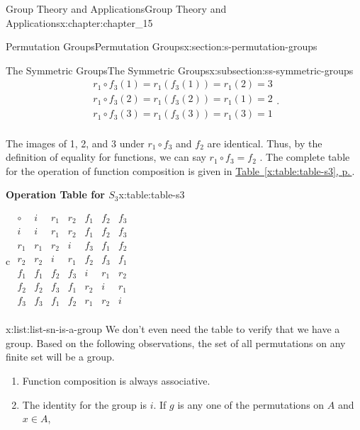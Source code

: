\documentclass[twoside,10pt,]{book}
\newcommand{\tabularfont}{\relax}
\newcommand{\xreffont}{\relax}
\numberwithin{equation}{section}
\newcommand{\hrulethick} {\noalign{\hrule height 0.11em}}
\begin{document}
\begin{chapterptx}{Group Theory and Applications}{}{Group Theory and Applications}{}{}{x:chapter:chapter_15}
\begin{sectionptx}{Permutation Groups}{}{Permutation Groups}{}{}{x:section:s-permutation-groups}
\begin{subsectionptx}{The Symmetric Groups}{}{The Symmetric Groups}{}{}{x:subsection:ss-symmetric-groups}
\begin{equation*}
\begin{array}{c}
r_1\circ f_3(1) =r_1\left(f_3(1)\right)= r_1(2)=3 \\
r_1\circ f_3(2)=r_1\left(f_3(2)\right)= r_1(1)= 2 \\
r_1\circ f_3(3)=r_1\left(f_3(3)\right)= r_1(3)= 1\\
\end{array}\text{.}
\end{equation*}
%
\par
The images of 1, 2, and 3 under \(r_1\circ f_3\) and \(f_2\) are identical. Thus, by the definition of equality for functions, we can say \(r_1\circ f_3=f_2\) . The complete table for the operation of function composition is given in \hyperref[x:table:table-s3]{Table~{\xreffont\ref{x:table:table-s3}}, p.\,\pageref{x:table:table-s3}}.%
\begin{tableptx}{\textbf{Operation Table for \(S_3\)}}{x:table:table-s3}{}%
\centering
{\tabularfont%
\begin{tabular}{c}\hrulethick
\(\begin{array}{c|cccccc}
\circ &   i &r_1 & r_2 & f_1 & f_2 & f_3 \\
\hline
i &  i &r_1 & r_2 & f_1 & f_2 & f_3 \\
r_1 &  r_1 &r_2 & i & f_3 & f_1 & f_2 \\
r_2 &  r_2 &i & r_1 & f_2 & f_3 & f_1 \\
f_1 & f_1 & f_2 & f_3 & i & r_1 & r_2 \\
f_2 & f_2 &f_3 & f_1 & r_2 & i & r_1 \\
f_3 & f_3 & f_1 & f_2 & r_1 & r_2 & i \\
\end{array}\)
\end{tabular}
}%
\end{tableptx}%
\begin{listptx}{\textbf{}}{x:list:list-sn-is-a-group}{}%
We don't even need the table to verify that we have a group. Based on the following observations, the set of all permutations on any finite set will be a group.%
%
\begin{enumerate}[label=(\arabic*)]
\item{}Function composition is always associative.%
\item{}The identity for the group is \(i\). If \(g\) is any one of the permutations on \(A\) and  \(x\in A\),%
\begin{equation*}
\begin{array}{lr}

\end{array}
\end{equation*}
\end{enumerate}
\end{listptx}
\end{subsectionptx}
\end{sectionptx}
\end{chapterptx}
\end{document}
